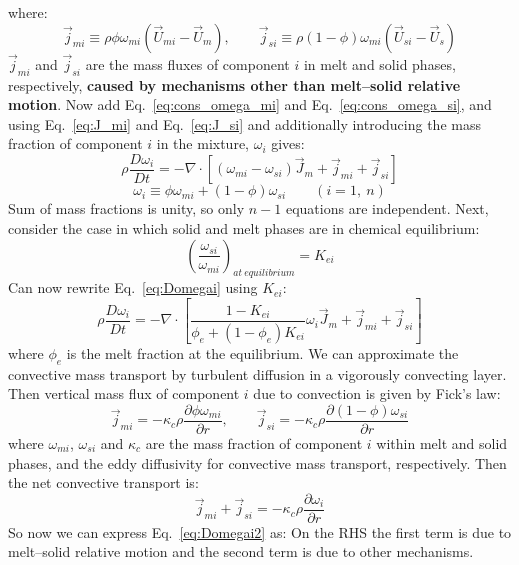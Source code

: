 where:
\begin{equation}
\vec{j}_{mi} \equiv \rho \phi \omega_{mi} ( \vec{U}_{mi}-\vec{U}_m ), \qquad \vec{j}_{si} \equiv \rho (1-\phi) \omega_{mi} (\vec{U}_{si}-\vec{U}_s)
\end{equation}
$\vec{j}_{mi}$ and $\vec{j}_{si}$ are the mass fluxes of component $i$ in melt and solid phases, respectively, \textbf{caused by mechanisms other than melt--solid relative motion}.  Now add Eq.~\ref{eq:cons_omega_mi} and Eq.~\ref{eq:cons_omega_si}, and using Eq.~\ref{eq:J_mi} and Eq.~\ref{eq:J_si} and additionally introducing the mass fraction of component $i$ in the mixture, $\omega_i$ gives:
\begin{equation}
\rho \frac{D\omega_i}{Dt} = -\nabla \cdot \left[ (\omega_{mi}-\omega_{si}) \vec{J}_m + \vec{j}_{mi} + \vec{j}_{si} \right]
\label{eq:Domegai}
\end{equation}
\begin{equation}
\omega_i \equiv \phi \omega_{mi} + (1-\phi) \omega_{si} \qquad (i=1,\ n)
\end{equation}
Sum of mass fractions is unity, so only $n-1$ equations are independent.  Next, consider the case in which solid and melt phases are in chemical equilibrium:
\begin{equation}
\left( \frac{\omega_{si}}{\omega_{mi}} \right)_{at\ equilibrium} = K_{ei}
\end{equation}
Can now rewrite Eq.~\ref{eq:Domegai} using $K_{ei}$:
\begin{equation}
\rho \frac{D \omega_i}{D t} = - \nabla \cdot \left[ \frac{1-K_{ei}}{\phi_e+(1-\phi_e)K_{ei}} \omega_i \vec{J}_{m} + \vec{j}_{mi} + \vec{j}_{si} \right]
\label{eq:Domegai2}
\end{equation}
where $\phi_e$ is the melt fraction at the equilibrium.  We can approximate the convective mass transport by turbulent diffusion in a vigorously convecting layer.  Then vertical mass flux of component $i$ due to convection is given by Fick's law:
\begin{equation}
\vec{j}_{mi} = -\kappa_c \rho \frac{\partial \phi \omega_{mi}}{\partial r}, \qquad \vec{j}_{si} = -\kappa_c \rho \frac{\partial (1-\phi) \omega_{si}}{\partial r}
\end{equation}
where $\omega_{mi}$, $\omega_{si}$ and $\kappa_c$ are the mass fraction of component $i$ within melt and solid phases, and the eddy diffusivity for convective mass transport, respectively.  Then the net convective transport is:
\begin{equation}
\vec{j}_{mi} + \vec{j}_{si} = -\kappa_c \rho \frac{\partial \omega_i}{\partial r}
\end{equation}
So now we can express Eq.~\ref{eq:Domegai2} as:
On the RHS the first term is due to melt--solid relative motion and the second term is due to other mechanisms.

